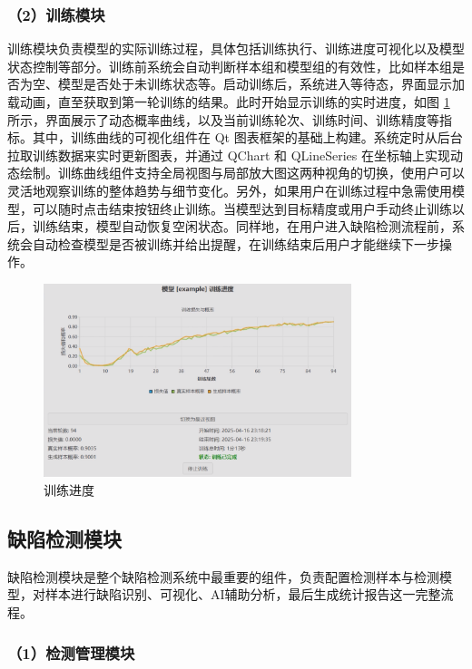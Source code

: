 \documentclass[
  ]{njuthesis}
\begin{document}
\subsubsection{（2）训练模块}

训练模块负责模型的实际训练过程，具体包括训练执行、训练进度可视化以及模型状态控制等部分。训练前系统会自动判断样本组和模型组的有效性，比如样本组是否为空、模型是否处于未训练状态等。启动训练后，系统进入等待态，界面显示加载动画，直至获取到第一轮训练的结果。此时开始显示训练的实时进度，如图 \ref{训练进度} 所示，界面展示了动态概率曲线，以及当前训练轮次、训练时间、训练精度等指标。其中，训练曲线的可视化组件在 Qt 图表框架的基础上构建。系统定时从后台拉取训练数据来实时更新图表，并通过 QChart 和 QLineSeries 在坐标轴上实现动态绘制。训练曲线组件支持全局视图与局部放大图这两种视角的切换，使用户可以灵活地观察训练的整体趋势与细节变化。另外，如果用户在训练过程中急需使用模型，可以随时点击结束按钮终止训练。当模型达到目标精度或用户手动终止训练以后，训练结束，模型自动恢复空闲状态。同样地，在用户进入缺陷检测流程前，系统会自动检查模型是否被训练并给出提醒，在训练结束后用户才能继续下一步操作。

\begin{figure}[htb]
    \centering
    \includegraphics[width=0.80\textwidth]{images/训练进度.png}
    \caption{训练进度}
    \label{训练进度}
\end{figure}

\subsection{缺陷检测模块}

缺陷检测模块是整个缺陷检测系统中最重要的组件，负责配置检测样本与检测模型，对样本进行缺陷识别、可视化、AI辅助分析，最后生成统计报告这一完整流程。

\subsubsection{（1）检测管理模块}
\end{document}
